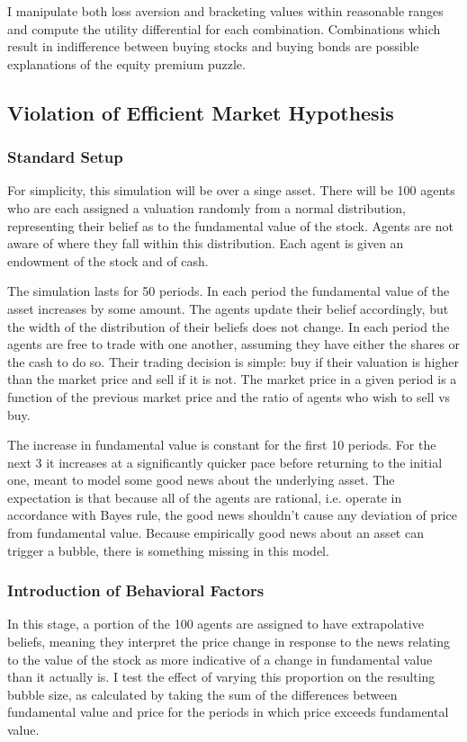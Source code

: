 \documentclass[10pt,twocolumn]{article}
\begin{document}
I manipulate both loss aversion and bracketing values within reasonable ranges and compute the utility differential for each combination. Combinations which result in indifference between buying stocks and buying bonds are possible explanations of the equity premium puzzle. 

\subsection{Violation of Efficient Market Hypothesis}
\subsubsection{Standard Setup}
For simplicity, this simulation will be over a singe asset. There will be 100 agents who are each assigned a valuation randomly from a normal distribution, representing their belief as to the fundamental value of the stock. Agents are not aware of where they fall within this distribution. Each agent is given an endowment of the stock and of cash.

The simulation lasts for 50 periods. In each period the fundamental value of the asset increases by some amount. The agents update their belief accordingly, but the width of the distribution of their beliefs does not change. In each period the agents are free to trade with one another, assuming they have either the shares or the cash to do so. Their trading decision is simple: buy if their valuation is higher than the market price and sell if it is not. The market price in a given period is a function of the previous market price and the ratio of agents who wish to sell vs buy. 

The increase in fundamental value is constant for the first 10 periods. For the next 3 it increases at a significantly quicker pace before returning to the initial one, meant to model some good news about the underlying asset. The expectation is that because all of the agents are rational, i.e. operate in accordance with Bayes rule, the good news shouldn't cause any deviation of price from fundamental value. Because empirically good news about an asset can trigger a bubble, there is something missing in this model.

\subsubsection{Introduction of Behavioral Factors}
In this stage, a portion of the 100 agents are assigned to have extrapolative beliefs, meaning they interpret the price change in response to the news relating to the value of the stock as more indicative of a change in fundamental value than it actually is. I test the effect of varying this proportion on the resulting bubble size, as calculated by taking the sum of the differences between fundamental value and price for the periods in which price exceeds fundamental value. 
\end{document}
